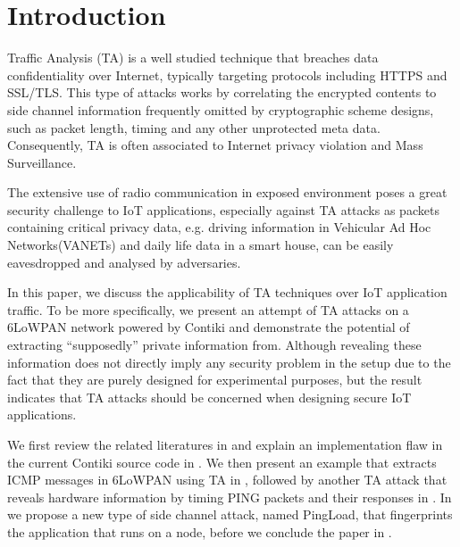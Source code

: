 \section{Introduction}
Traffic Analysis (TA) is a well studied technique that breaches data confidentiality over Internet, typically targeting protocols including HTTPS\cite{rfc2818} and SSL\cite{rfc6101}/TLS\cite{rfc5246}. This type of attacks works by correlating the encrypted contents to side channel information frequently omitted by cryptographic scheme designs, such as packet length, timing and any other unprotected meta data. Consequently, TA is often associated to Internet privacy violation and Mass Surveillance.

The extensive use of radio communication in exposed environment poses a great security challenge to IoT applications, especially against TA attacks as packets containing critical privacy data, e.g. driving information in Vehicular Ad Hoc Networks(VANETs)\cite{VANET} and daily life data in a smart house, can be easily eavesdropped and analysed by adversaries.

In this paper, we discuss the applicability of TA techniques over IoT application traffic. To be more specifically, we present an attempt of TA attacks on a 6LoWPAN\cite{rfc4944} network powered by Contiki\cite{Contiki} and demonstrate the potential of extracting ``supposedly'' private information from. Although revealing these information does not directly imply any security problem in the setup due to the fact that they are purely designed for experimental purposes, but the result indicates that TA attacks should be concerned when designing secure IoT applications.

We first review the related literatures in  and explain an implementation flaw in the current Contiki source code in . We then present an example that extracts ICMP messages in 6LoWPAN using TA in , followed by another TA attack that reveals hardware information by timing PING packets and their responses in . In  we propose a new type of side channel attack, named PingLoad, that fingerprints the application that runs on a node, before we conclude the paper in .

